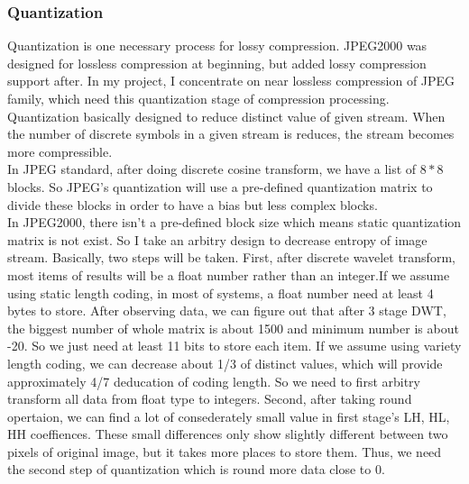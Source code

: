 \documentclass[UTF8, letterpaper, 14pt]{article}
\begin{document}
\subsubsection{Quantization}
Quantization is one necessary process for lossy compression. JPEG2000 was designed for lossless compression at beginning, but added lossy compression support after. In my project, I concentrate on near lossless compression of JPEG family, which need this quantization stage of compression processing. Quantization basically designed to reduce distinct value of given stream. When the number of discrete symbols in a given stream is reduces, the stream becomes more compressible. \\
In JPEG standard, after doing discrete cosine transform, we have a list of $8*8$ blocks. So JPEG's quantization will use a pre-defined quantization matrix to divide these blocks in order to have a bias but less complex blocks. \\
In JPEG2000, there isn't a pre-defined block size which means static quantization matrix is not exist. So I take an arbitry design to decrease entropy of image stream. Basically, two steps will be taken. First, after discrete wavelet transform, most items of results will be a float number rather than an integer.If we assume using static length coding, in most of systems, a float number need at least 4 bytes to store. After observing data, we can figure out that after 3 stage DWT, the biggest number of whole matrix is about 1500 and minimum number is about -20. So we just need at least 11 bits to store each item. If we assume using variety length coding, we can decrease about 1/3 of distinct values, which will provide approximately 4/7 deducation of coding length. So we need to first arbitry transform all data from float type to integers. Second, after taking round opertaion, we can find a lot of consederately small value in first stage's LH, HL, HH coeffiences. These small differences only show slightly different between two pixels of original image, but it takes more places to store them. Thus, we need the second step of quantization which is round more data close to 0. \\
\end{document}
